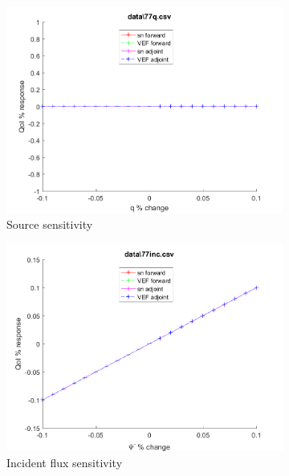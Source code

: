 \documentclass{article}
\begin{document}
\begin{figure}[H]
\label{Case77Sens}
\centering
\begin{subfigure}{.5\textwidth}
  \centering
  \includegraphics[width=.98\linewidth]{IanProposal/figures2/77qSens.png}
  \caption{Source sensitivity}
  \label{fig:sfig1}
\end{subfigure}%
\begin{subfigure}{.5\textwidth}
  \centering
  \includegraphics[width=.98\linewidth]{IanProposal/figures2/77incSens.png}
  \caption{Incident flux sensitivity}
  \label{fig:sfig4}
\end{subfigure}%
\\
\begin{subfigure}{.5\textwidth}
  \centering

\end{subfigure}
\end{figure}
\end{document}
